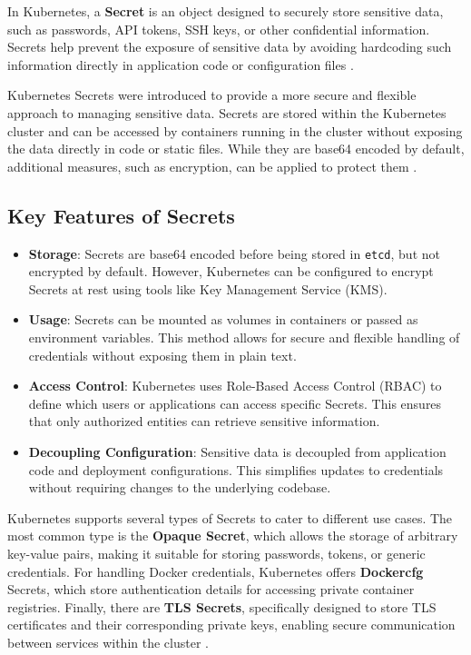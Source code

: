 \documentclass[a4paper,11pt,openright,BCOR=15mm]{scrbook}
\begin{document}
In Kubernetes, a \textbf{Secret} is an object designed to securely store sensitive data, such as passwords, API tokens, SSH keys, or other confidential information. Secrets help prevent the exposure of sensitive data by avoiding hardcoding such information directly in application code or configuration files \cite{the_linux_foundation_secrets_2024}.

Kubernetes Secrets were introduced to provide a more secure and flexible approach to managing sensitive data. Secrets are stored within the Kubernetes cluster and can be accessed by containers running in the cluster without exposing the data directly in code or static files. While they are base64 encoded by default, additional measures, such as encryption, can be applied to protect them \cite{the_linux_foundation_secrets_2024}.

\subsection{Key Features of Secrets}
\begin{itemize}
	\item \textbf{Storage}: Secrets are base64 encoded before being stored in \texttt{etcd}, but not encrypted by default. However, Kubernetes can be configured to encrypt Secrets at rest using tools like Key Management Service (KMS).
	\item \textbf{Usage}: Secrets can be mounted as volumes in containers or passed as environment variables. This method allows for secure and flexible handling of credentials without exposing them in plain text.
	\item \textbf{Access Control}: Kubernetes uses Role-Based Access Control (RBAC) to define which users or applications can access specific Secrets. This ensures that only authorized entities can retrieve sensitive information.
	\item \textbf{Decoupling Configuration}: Sensitive data is decoupled from application code and deployment configurations. This simplifies updates to credentials without requiring changes to the underlying codebase.
\end{itemize}

Kubernetes supports several types of Secrets to cater to different use cases. The most common type is the \textbf{Opaque Secret}, which allows the storage of arbitrary key-value pairs, making it suitable for storing passwords, tokens, or generic credentials. For handling Docker credentials, Kubernetes offers \textbf{Dockercfg} Secrets, which store authentication details for accessing private container registries. Finally, there are \textbf{TLS Secrets}, specifically designed to store TLS certificates and their corresponding private keys, enabling secure communication between services within the cluster \cite{the_linux_foundation_secrets_2024}.
		
\end{document}
